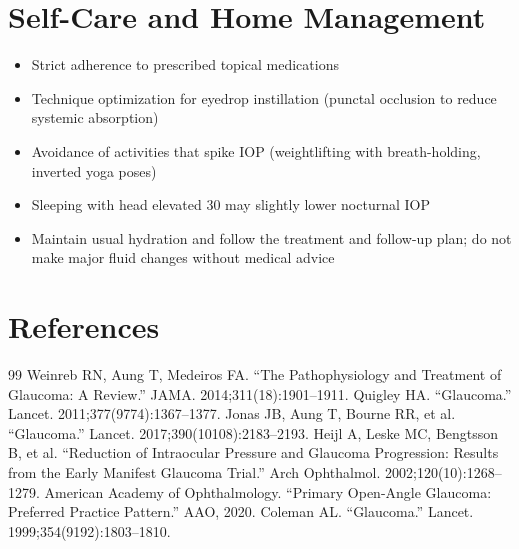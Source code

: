 \section*{Self-Care and Home Management}
\begin{itemize}
  \item Strict adherence to prescribed topical medications
  \item Technique optimization for eyedrop instillation (punctal occlusion to reduce systemic absorption)
  \item Avoidance of activities that spike IOP (weightlifting with breath-holding, inverted yoga poses)
  \item Sleeping with head elevated 30\textdegree{} may slightly lower nocturnal IOP
  \item Maintain usual hydration and follow the treatment and follow-up plan; do not make major fluid changes without medical advice
\end{itemize}

\section*{References}
\begin{thebibliography}{99}
 Weinreb RN, Aung T, Medeiros FA. ``The Pathophysiology and Treatment of Glaucoma: A Review.'' JAMA. 2014;311(18):1901--1911.
 Quigley HA. ``Glaucoma.'' Lancet. 2011;377(9774):1367--1377.
 Jonas JB, Aung T, Bourne RR, et al. ``Glaucoma.'' Lancet. 2017;390(10108):2183--2193.
 Heijl A, Leske MC, Bengtsson B, et al. ``Reduction of Intraocular Pressure and Glaucoma Progression: Results from the Early Manifest Glaucoma Trial.'' Arch Ophthalmol. 2002;120(10):1268--1279.
 American Academy of Ophthalmology. ``Primary Open-Angle Glaucoma: Preferred Practice Pattern.'' AAO, 2020.
 Coleman AL. ``Glaucoma.'' Lancet. 1999;354(9192):1803--1810.
\end{thebibliography}
